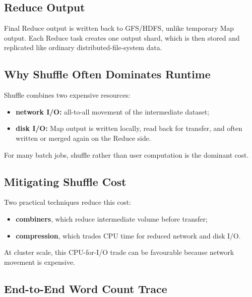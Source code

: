 \documentclass[11pt,a4paper,oneside]{book}
\begin{document}
\subsection{Reduce Output}

Final Reduce output is written back to GFS/HDFS, unlike temporary Map output. Each Reduce task creates one output shard, which is then stored and replicated like ordinary distributed-file-system data.

\subsection{Why Shuffle Often Dominates Runtime}

Shuffle combines two expensive resources:

\begin{itemize}
    \item \textbf{network I/O:} all-to-all movement of the intermediate dataset;
    \item \textbf{disk I/O:} Map output is written locally, read back for transfer, and often written or merged again on the Reduce side.
\end{itemize}

For many batch jobs, shuffle rather than user computation is the dominant cost.

\subsection{Mitigating Shuffle Cost}

Two practical techniques reduce this cost:

\begin{itemize}
    \item \textbf{combiners}, which reduce intermediate volume before transfer;
    \item \textbf{compression}, which trades CPU time for reduced network and disk I/O.
\end{itemize}

At cluster scale, this CPU-for-I/O trade can be favourable because network movement is expensive.

\subsection{End-to-End Word Count Trace}
\end{document}
